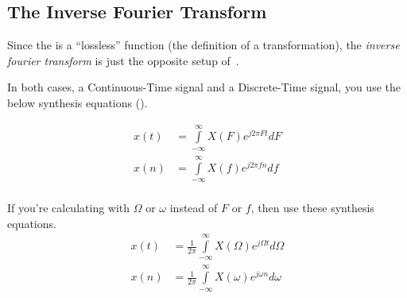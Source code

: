 \subsection{The Inverse Fourier Transform}\label{subsec:InverseFourierTransform}
\begin{definition}\label{def:InverseFourierTransform}
  Since the  is a ``lossless'' function (the definition of a transformation), the \emph{inverse fourier transform} is just the opposite setup of~.

  In both cases, a Continuous-Time signal and a Discrete-Time signal, you use the below synthesis equations ().
  
  \begin{equation}\label{eq:InverseFourierTransform-Frequency}
    \begin{aligned}
      x(t) &= \int\limits_{-\infty}^{\infty} X(F) e^{j 2\pi Ft} dF \\
      x(n) &= \int\limits_{-\infty}^{\infty} X(f) e^{j 2\pi fn} df \\
    \end{aligned}
  \end{equation}

  If you're calculating with $\Omega$ or $\omega$ instead of $F$ or $f$, then use these synthesis equations.
  \begin{equation}\label{eq:InverseFourierTransform-Omega}
    \begin{aligned}
      x(t) &= \frac{1}{2\pi} \int\limits_{-\infty}^{\infty} X(\Omega) e^{j \Omega t} d\Omega \\
      x(n) &= \frac{1}{2\pi} \int\limits_{-\infty}^{\infty} X(\omega) e^{j \omega n} d\omega \\
    \end{aligned}
  \end{equation}
\end{definition}

